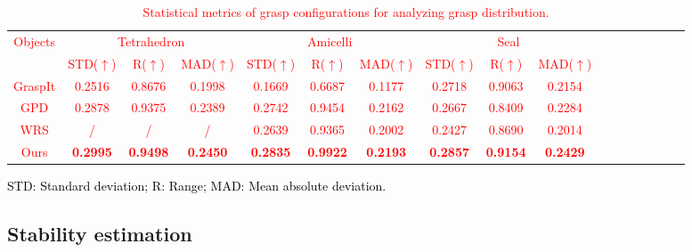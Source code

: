 \documentclass[journal]{IEEEtran}
\newcommand{\rev}[1]{\textcolor{red}{#1}}
\newcommand{\bl}[1]{\textcolor{black}{#1}}
\begin{document}
\begin{table}[t]
    \centering
    \small
    \setlength{\tabcolsep}{8pt}
    \caption{\rev{Statistical metrics of grasp configurations for analyzing grasp distribution.}}
    \label{tab:distribution_metrics}
    \rev{\begin{threeparttable}
        \begin{tabular}{cccc ccc ccc ccc ccc c}
        \toprule
        Objects & \multicolumn{3}{c}{Tetrahedron} & \multicolumn{3}{c}{Amicelli} & \multicolumn{3}{c}{Seal}\\
        \cmidrule(lr){2-4} \cmidrule(lr){5-7} \cmidrule(lr){8-10}
         & STD($\uparrow$) & R($\uparrow$) & MAD($\uparrow$) & STD($\uparrow$) & R($\uparrow$) & MAD($\uparrow$) & STD($\uparrow$) & R($\uparrow$) & MAD($\uparrow$) &  \\
        \midrule
        GraspIt\cite{miller2004graspit} & 0.2516 & 0.8676 & 0.1998 & 0.1669 & 0.6687 & 0.1177 & 0.2718 & 0.9063 & 0.2154\\
        GPD\cite{ten2017grasp}& 0.2878 & 0.9375 & 0.2389 & 0.2742 & 0.9454 & 0.2162 & 0.2667 & 0.8409 & 0.2284\\
        WRS\cite{wan2020planning}& / & / & / & 0.2639 & 0.9365 & 0.2002 & 0.2427 & 0.8690 & 0.2014\\
        Ours & \textbf{0.2995} & \textbf{0.9498} & \textbf{0.2450} & \textbf{0.2835} & \textbf{0.9922} & \textbf{0.2193} & \textbf{0.2857} & \textbf{0.9154} & \textbf{0.2429}\\
        \bottomrule
    \end{tabular}
    \begin{tablenotes}
        \footnotesize
         \bl{STD: Standard deviation; R: Range; MAD: Mean absolute deviation.}
     \end{tablenotes}
    \end{threeparttable}}
\end{table}

\subsection{Stability estimation}
\end{document}

